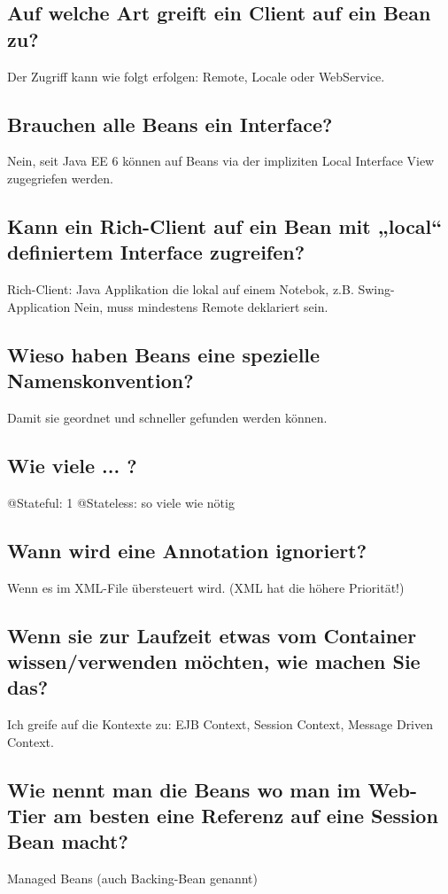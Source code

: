 \subsection{Auf welche Art greift ein Client auf ein Bean zu?}
Der Zugriff kann wie folgt erfolgen: Remote, Locale oder WebService.

\subsection{Brauchen alle Beans ein Interface?}
Nein, seit Java EE 6 können auf Beans via der impliziten Local Interface View zugegriefen werden.

\subsection{Kann ein Rich-Client auf ein Bean mit „local“ definiertem Interface zugreifen?}
Rich-Client: Java Applikation die lokal auf einem Notebok, z.B. Swing-Application
Nein, muss mindestens Remote deklariert sein.

\subsection{Wieso haben Beans eine spezielle Namenskonvention?}
Damit sie geordnet und schneller gefunden werden können.

\subsection{Wie viele ... ?}
@Stateful: 1
@Stateless: so viele wie nötig

\subsection{Wann wird eine Annotation ignoriert?}
Wenn es im XML-File übersteuert wird. (XML hat die höhere Priorität!)

\subsection{Wenn sie zur Laufzeit etwas vom Container wissen/verwenden möchten, wie machen Sie das?}
Ich greife auf die Kontexte zu: EJB Context, Session Context, Message Driven Context.

\subsection{Wie nennt man die Beans wo man im Web-Tier am besten eine Referenz auf eine Session Bean macht?}
Managed Beans (auch Backing-Bean genannt)
